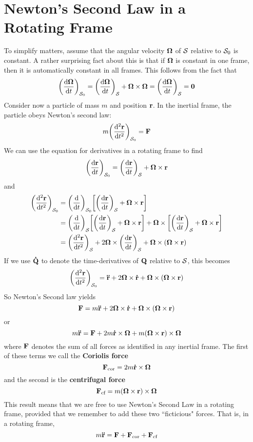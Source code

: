 \section{Newton's Second Law in a Rotating Frame}
To simplify matters, assume that the angular velocity $\boldsymbol{\Omega}$ of $\mathcal{S}$ relative to $\mathcal{S}_0$ is constant. A rather surprising fact about this is that if $\boldsymbol{\Omega}$ is constant in one frame, then it is automatically constant in all frames. This follows from the fact that 
\[ \pqty{\dv{\bsm \Omega}{t}}_{\mcl S_0} = \pqty{\dv{\bsm \Omega}{t}}_{\mcl S} + \bsm \Omega \times \bsm \Omega = \pqty{\dv{\bsm \Omega}{t}}_{\mcl S} = \mbf 0\]
Consider now a particle of mass $m$ and position $\mathbf{r}$. In the inertial frame, the particle obeys Newton's second law:
\[ m\pqty{\dv[2]{\mbf r}{t}}_{\mcl S_0} = \mbf F\]
We can use the equation for derivatives in a rotating frame to find
\[ \pqty{\dv{\mbf r}{t}}_{\mcl S_0} = \pqty{\dv{\mbf r}{t}}_{\mcl S} + \bsm \Omega \times \mbf r \]
and
\begin{align*}
    \pqty{\dv[2]{\mbf r}{t}}_{\mcl S_0} &=  \pqty{\dv{t}}_{\mcl S_0}\bqty{\pqty{\dv{\mbf r}{t}}_{\mcl S} + \bsm \Omega \times \mbf r} \\
    &= \pqty{\dv{t}}_{\mcl S} \bqty{\pqty{\dv{\mbf r}{t}}_{\mcl S} + \bsm \Omega \times \mbf r} + \bsm\Omega \times \bqty{\pqty{\dv{\mbf r}{t}}_{\mcl S} + \bsm \Omega \times \mbf r} \\
    &= \pqty{\dv[2]{\mbf r}{t}}_{\mcl S} + 2\bsm\Omega \times \pqty{\dv{\mbf r}{t}}_{\mcl S} + \bsm\Omega\times(\bsm\Omega\times \mbf r)
\end{align*}
If we use $\mathbf{\dot Q}$ to denote the time-derivatives of $\mathbf{Q}$ relative to $\mathcal{S}$, this becomes
\[  \pqty{\dv[2]{\mbf r}{t}}_{\mcl S_0} = \mbf{\ddot r} + 2\bsm\Omega \times \mbf{\dot r} + \bsm\Omega \times (\bsm\Omega\times \mbf r)\]
So Newton's Second law yields
\[ \mathbf{F} =  m\mathbf{\ddot r} + 2\boldsymbol{\Omega}\times\mathbf{\dot r} + \boldsymbol{\Omega}\times(\boldsymbol{\Omega}\times \mathbf{r}) \]
or
\[ m\mathbf{\ddot r} = \mathbf{F} + 2m\mathbf{\dot r}\times\boldsymbol{\Omega} + m(\boldsymbol{\Omega}\times\mathbf{r})\times\boldsymbol{\Omega}\]
where $\mathbf{F}$ denotes the sum of all forces as identified in any inertial frame. The first of these terms we call the \textbf{Coriolis force}
\[ \mathbf{F}_\text{cor} = 2m\mathbf{\dot r}\times\boldsymbol{\Omega} \]
and the second is the \textbf{centrifugal force}
\[ \mathbf{F}_\text{cf} = m(\boldsymbol{\Omega}\times\mathbf{r})\times\boldsymbol{\Omega}\]
This result means that we are free to use Newton's Second Law in a rotating frame, provided that we remember to add these two ``ficticious" forces. That is, in a rotating frame,
\[ m\mathbf{\ddot r} = \mathbf{F} + \mathbf{F}_\text{cor} + \mathbf{F}_\text{cf} \]
